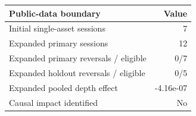 \begin{tabular}{lr}
\toprule
Public-data boundary & Value \\
\midrule
Initial single-asset sessions & 7 \\
Expanded primary sessions & 12 \\
Expanded primary reversals / eligible & 0/7 \\
Expanded holdout reversals / eligible & 0/5 \\
Expanded pooled depth effect & -4.16e-07 \\
Causal impact identified & No \\
\bottomrule
\end{tabular}

